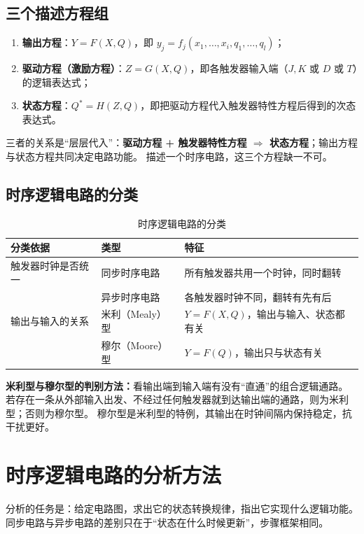 \subsection{三个描述方程组}
\begin{enumerate}
    \item \textbf{输出方程}：$Y=F(X,Q)$，即 $y_j=f_j(x_1,\dots,x_i,q_1,\dots,q_l)$；
    \item \textbf{驱动方程（激励方程）}：$Z=G(X,Q)$，即各触发器输入端（$J,K$ 或 $D$ 或 $T$）的逻辑表达式；
    \item \textbf{状态方程}：$Q^*=H(Z,Q)$，即把驱动方程代入触发器特性方程后得到的次态表达式。
\end{enumerate}
三者的关系是“层层代入”：\textbf{驱动方程 + 触发器特性方程 $\Rightarrow$ 状态方程}；输出方程与状态方程共同决定电路功能。
描述一个时序电路，这三个方程缺一不可。

\subsection{时序逻辑电路的分类}
\begin{table}[!htbp]
\centering
\caption{时序逻辑电路的分类}
\begin{tabular}{lll}
\toprule
分类依据 & 类型 & 特征 \\
\midrule
触发器时钟是否统一 & 同步时序电路 & 所有触发器共用一个时钟，同时翻转 \\
 & 异步时序电路 & 各触发器时钟不同，翻转有先有后 \\
\midrule
输出与输入的关系 & 米利（Mealy）型 & $Y=F(X,Q)$，输出与输入、状态都有关 \\
 & 穆尔（Moore）型 & $Y=F(Q)$，输出只与状态有关 \\
\bottomrule
\end{tabular}
\end{table}

\noindent\textbf{米利型与穆尔型的判别方法：}看输出端到输入端有没有“直通”的组合逻辑通路。
若存在一条从外部输入出发、不经过任何触发器就到达输出端的通路，则为米利型；否则为穆尔型。
穆尔型是米利型的特例，其输出在时钟间隔内保持稳定，抗干扰更好。

\section{时序逻辑电路的分析方法}
分析的任务是：给定电路图，求出它的状态转换规律，指出它实现什么逻辑功能。
同步电路与异步电路的差别只在于“状态在什么时候更新”，步骤框架相同。

